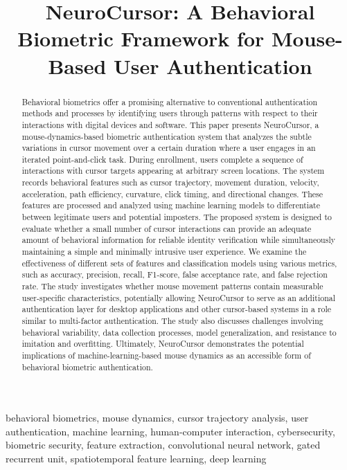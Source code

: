 \documentclass[conference]{IEEEtran}
\title{NeuroCursor: A Behavioral Biometric Framework for Mouse-Based User Authentication}
\author{
\IEEEauthorblockN{
Shaurya Saxena,
Chetan Gangireddy,
Shreehan Aalok Pathak,
and Hamid Abdul Mossa
}
\IEEEauthorblockA{
Department of Computer Science\\
The University of Texas at Dallas, Richardson, Texas, United States\\
}
}
\begin{document}
\maketitle

\begin{abstract}
Behavioral biometrics offer a promising alternative to conventional authentication methods and processes by identifying users through patterns with respect to their interactions with digital devices and software. This paper presents NeuroCursor, a mouse-dynamics-based biometric authentication system that analyzes the subtle variations in cursor movement over a certain duration where a user engages in an iterated point-and-click task. During enrollment, users complete a sequence of interactions with cursor targets appearing at arbitrary screen locations. The system records behavioral features such as cursor trajectory, movement duration, velocity, acceleration, path efficiency, curvature, click timing, and directional changes. These features are processed and analyzed using machine learning models to differentiate between legitimate users and potential imposters. The proposed system is designed to evaluate whether a small number of cursor interactions can provide an adequate amount of behavioral information for reliable identity verification while simultaneously maintaining a simple and minimally intrusive user experience. We examine the effectiveness of different sets of features and classification models using various metrics, such as accuracy, precision, recall, F1-score, false acceptance rate, and false rejection rate. The study investigates whether mouse movement patterns contain measurable user-specific characteristics, potentially allowing NeuroCursor to serve as an additional authentication layer for desktop applications and other cursor-based systems in a role similar to multi-factor authentication. The study also discusses challenges involving behavioral variability, data collection processes, model generalization, and resistance to imitation and overfitting. Ultimately, NeuroCursor demonstrates the potential implications of machine-learning-based mouse dynamics as an accessible form of behavioral biometric authentication. 
\end{abstract}

\begin{IEEEkeywords}
behavioral biometrics, mouse dynamics, cursor trajectory analysis, user authentication, machine learning, human-computer interaction, cybersecurity, biometric security, feature extraction, convolutional neural network, gated recurrent unit, spatiotemporal feature learning, deep learning 
\end{IEEEkeywords}
\end{document}
